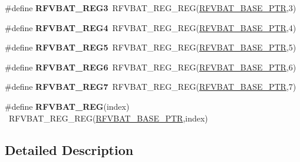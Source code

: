 \begin{DoxyCompactItemize}
\item 
\hypertarget{group___r_f_v_b_a_t___register___accessor___macros_ga7d8455bad7fb104b0a327253883e0df9}{}\#define {\bfseries R\+F\+V\+B\+A\+T\+\_\+\+R\+E\+G3}~R\+F\+V\+B\+A\+T\+\_\+\+R\+E\+G\+\_\+\+R\+E\+G(\hyperlink{group___r_f_v_b_a_t___peripheral_ga5b6418d9be20f84b2190ccf6134b7ba3}{R\+F\+V\+B\+A\+T\+\_\+\+B\+A\+S\+E\+\_\+\+P\+T\+R},3)\label{group___r_f_v_b_a_t___register___accessor___macros_ga7d8455bad7fb104b0a327253883e0df9}

\item 
\hypertarget{group___r_f_v_b_a_t___register___accessor___macros_ga94341c77e156361945ba570c7cf9d02a}{}\#define {\bfseries R\+F\+V\+B\+A\+T\+\_\+\+R\+E\+G4}~R\+F\+V\+B\+A\+T\+\_\+\+R\+E\+G\+\_\+\+R\+E\+G(\hyperlink{group___r_f_v_b_a_t___peripheral_ga5b6418d9be20f84b2190ccf6134b7ba3}{R\+F\+V\+B\+A\+T\+\_\+\+B\+A\+S\+E\+\_\+\+P\+T\+R},4)\label{group___r_f_v_b_a_t___register___accessor___macros_ga94341c77e156361945ba570c7cf9d02a}

\item 
\hypertarget{group___r_f_v_b_a_t___register___accessor___macros_ga59735a620ffb54ec36ce0b413be0ac35}{}\#define {\bfseries R\+F\+V\+B\+A\+T\+\_\+\+R\+E\+G5}~R\+F\+V\+B\+A\+T\+\_\+\+R\+E\+G\+\_\+\+R\+E\+G(\hyperlink{group___r_f_v_b_a_t___peripheral_ga5b6418d9be20f84b2190ccf6134b7ba3}{R\+F\+V\+B\+A\+T\+\_\+\+B\+A\+S\+E\+\_\+\+P\+T\+R},5)\label{group___r_f_v_b_a_t___register___accessor___macros_ga59735a620ffb54ec36ce0b413be0ac35}

\item 
\hypertarget{group___r_f_v_b_a_t___register___accessor___macros_ga8f932612a87a5a7e302b4990c3880b03}{}\#define {\bfseries R\+F\+V\+B\+A\+T\+\_\+\+R\+E\+G6}~R\+F\+V\+B\+A\+T\+\_\+\+R\+E\+G\+\_\+\+R\+E\+G(\hyperlink{group___r_f_v_b_a_t___peripheral_ga5b6418d9be20f84b2190ccf6134b7ba3}{R\+F\+V\+B\+A\+T\+\_\+\+B\+A\+S\+E\+\_\+\+P\+T\+R},6)\label{group___r_f_v_b_a_t___register___accessor___macros_ga8f932612a87a5a7e302b4990c3880b03}

\item 
\hypertarget{group___r_f_v_b_a_t___register___accessor___macros_gadfbd3389e8e352e6fa869c5637131038}{}\#define {\bfseries R\+F\+V\+B\+A\+T\+\_\+\+R\+E\+G7}~R\+F\+V\+B\+A\+T\+\_\+\+R\+E\+G\+\_\+\+R\+E\+G(\hyperlink{group___r_f_v_b_a_t___peripheral_ga5b6418d9be20f84b2190ccf6134b7ba3}{R\+F\+V\+B\+A\+T\+\_\+\+B\+A\+S\+E\+\_\+\+P\+T\+R},7)\label{group___r_f_v_b_a_t___register___accessor___macros_gadfbd3389e8e352e6fa869c5637131038}

\item 
\hypertarget{group___r_f_v_b_a_t___register___accessor___macros_ga73d57e05c3f341bac06fd7fdc7adb216}{}\#define {\bfseries R\+F\+V\+B\+A\+T\+\_\+\+R\+E\+G}(index)                                            ~R\+F\+V\+B\+A\+T\+\_\+\+R\+E\+G\+\_\+\+R\+E\+G(\hyperlink{group___r_f_v_b_a_t___peripheral_ga5b6418d9be20f84b2190ccf6134b7ba3}{R\+F\+V\+B\+A\+T\+\_\+\+B\+A\+S\+E\+\_\+\+P\+T\+R},index)\label{group___r_f_v_b_a_t___register___accessor___macros_ga73d57e05c3f341bac06fd7fdc7adb216}

\end{DoxyCompactItemize}


\subsection{Detailed Description}
